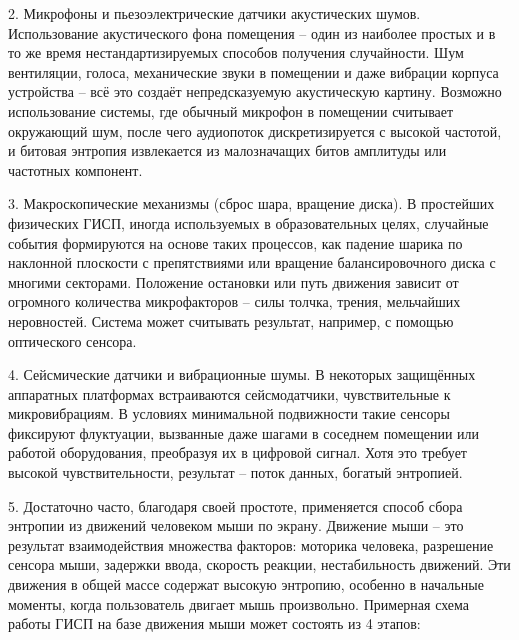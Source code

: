 2. Микрофоны и пьезоэлектрические датчики акустических шумов.
Использование акустического фона помещения -- один из наиболее простых и
в то же время нестандартизируемых способов получения случайности. Шум
вентиляции, голоса, механические звуки в помещении и даже вибрации
корпуса устройства -- всё это создаёт непредсказуемую акустическую
картину. Возможно использование системы, где обычный микрофон в
помещении считывает окружающий шум, после чего аудиопоток
дискретизируется с высокой частотой, и битовая энтропия извлекается из
малозначащих битов амплитуды или частотных компонент.

3. Макроскопические механизмы (сброс шара, вращение диска). В простейших
физических ГИСП, иногда используемых в образовательных целях, случайные
события формируются на основе таких процессов, как падение шарика по
наклонной плоскости с препятствиями или вращение балансировочного диска
с многими секторами. Положение остановки или путь движения зависит от
огромного количества микрофакторов -- силы толчка, трения, мельчайших
неровностей. Система может считывать результат, например, с помощью
оптического сенсора.

4. Сейсмические датчики и вибрационные шумы. В некоторых защищённых
аппаратных платформах встраиваются сейсмодатчики, чувствительные к
микровибрациям. В условиях минимальной подвижности такие сенсоры
фиксируют флуктуации, вызванные даже шагами в соседнем помещении или
работой оборудования, преобразуя их в цифровой сигнал. Хотя это требует
высокой чувствительности, результат -- поток данных, богатый энтропией.

5. Достаточно часто, благодаря своей простоте, применяется способ сбора
энтропии из движений человеком мыши по экрану. Движение мыши -- это
результат взаимодействия множества факторов: моторика человека,
разрешение сенсора мыши, задержки ввода, скорость реакции,
нестабильность движений. Эти движения в общей массе содержат высокую
энтропию, особенно в начальные моменты, когда пользователь двигает мышь
произвольно. Примерная схема работы ГИСП на базе движения мыши может
состоять из 4 этапов:

